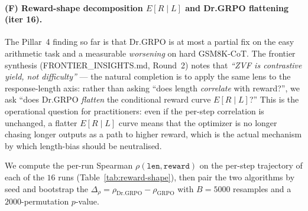 \paragraph{(F) Reward-shape decomposition $E[R \mid L]$ and Dr.GRPO flattening (iter 16).}
The Pillar~4 finding so far is that Dr.GRPO is at most a partial fix on the
easy arithmetic task and a measurable \emph{worsening} on hard GSM8K-CoT.
The frontier synthesis (FRONTIER\_INSIGHTS.md, Round~2) notes that
\textit{``ZVF is contrastive yield, not difficulty''} --- the natural
completion is to apply the same lens to the response-length axis: rather
than asking ``does length \emph{correlate} with reward?'', we ask
``does Dr.GRPO \emph{flatten} the conditional reward curve $E[R \mid L]$?''
This is the operational question for practitioners: even if the
per-step correlation is unchanged, a flatter $E[R\mid L]$ curve means
that the optimizer is no longer chasing longer outputs as a path to
higher reward, which is the actual mechanism by which length-bias
should be neutralised.

We compute the per-run Spearman $\rho(\texttt{len}, \texttt{reward})$
on the per-step trajectory of each of the $16$ runs (Table~\ref{tab:reward-shape}),
then pair the two algorithms by seed and bootstrap the
$\Delta_{\rho} = \rho_{\mathrm{Dr.GRPO}} - \rho_{\mathrm{GRPO}}$ with
$B{=}5000$ resamples and a $2000$-permutation $p$-value.

\begin{table}[htbp]
\centering\small
{}
\caption{\textbf{Reward-shape decomposition (iter 16).}
Per-run Spearman $\rho(\texttt{len},\texttt{reward})$ and Theil--Sen slope
of the conditional reward curve $E[R\mid L]$, aggregated across seeds
per (task, algo). The paired-bootstrap $\Delta_{\rho}$
(Dr.GRPO $-$ GRPO) is the cleaner test of whether Dr.GRPO flattens the
reward curve. On the easy arithmetic task Dr.GRPO reduces the negative
length--reward coupling by $\sim 26\%$ relative to GRPO (paired
$p_{\mathrm{perm}}{=}0.058$, $n{=}5$ pairs); on the hard GSM8K-CoT task
Dr.GRPO \emph{deepens} the coupling by $\sim 20\%$ (paired
$p_{\mathrm{perm}}{=}0.130$, $n{=}3$ pairs). Theil--Sen slope direction
matches the Spearman sign in every cell.}
\label{tab:reward-shape}
\end{table}

